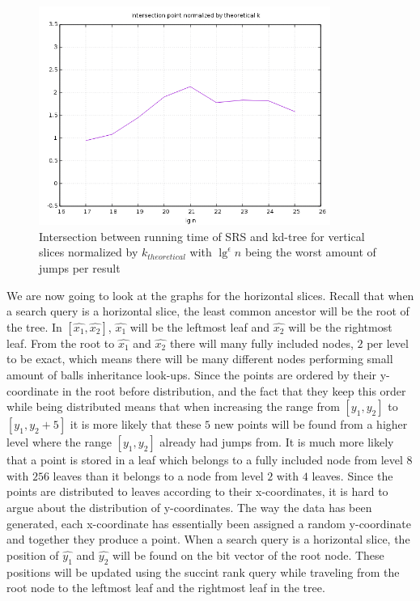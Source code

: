 \begin{figure}[h]
    \centering
    \includegraphics[width = 0.85\textwidth]{pictures/analysis/vert_theory_worst_jump.png}
    \caption{Intersection between running time of SRS and kd-tree for vertical slices normalized by $k_{theoretical}$ with $\lg^\epsilon n$ being the worst amount of jumps per result}\label{fig:vert_theory_worst_jump}
\end{figure}
\clearpage


We are now going to look at the graphs for the horizontal slices. Recall that when a search query is a horizontal slice, the least common ancestor will be the root of the tree. In $[\hat{x_1}, \hat{x_2}]$, $\hat{x_1}$ will be the leftmost leaf and $\hat{x_2}$ will be the rightmost leaf. From the root to $\hat{x_1}$ and $\hat{x_2}$ there will many fully included nodes, $2$ per level to be exact, which means there will be many different nodes performing small amount of balls inheritance look-ups. Since the points are ordered by their y-coordinate in the root before distribution, and the fact that they keep this order while being distributed means that when increasing the range from $[y_1, y_2]$ to $[y_1, y_2 + 5]$ it is more likely that these $5$ new points will be found from a higher level where the range $[y_1, y_2]$ already had jumps from. It is much more likely that a point is stored in a leaf which belongs to a fully included node from level $8$ with $256$ leaves than it belongs to a node from level $2$ with $4$ leaves. Since the points are distributed to leaves according to their x-coordinates, it is hard to argue about the distribution of y-coordinates. The way the data has been generated, each x-coordinate has essentially been assigned a random y-coordinate and together they produce a point. When a search query is a horizontal slice, the position of $\hat{y_1}$ and $\hat{y_2}$ will be found on the bit vector of the root node. These positions will be updated using the succint rank query while traveling from the root node to the leftmost leaf and the rightmost leaf in the tree.

